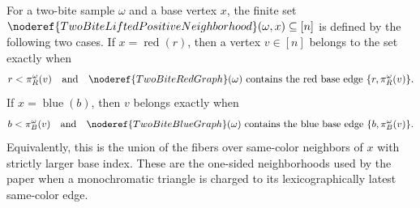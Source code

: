 \begin{definition}
For a two-bite sample \(\omega\) and a base vertex \(x\), the finite set
\(\noderef{TwoBiteLiftedPositiveNeighborhood}(\omega,x)\subseteq[n]\) is
defined by the following two cases.  If \(x=\operatorname{red}(r)\), then a
vertex \(v\in[n]\) belongs to the set exactly when
\[
r<\pi_R^\omega(v)
\quad\text{and}\quad
\noderef{TwoBiteRedGraph}(\omega)\text{ contains the red base edge }
\{r,\pi_R^\omega(v)\}.
\]
If \(x=\operatorname{blue}(b)\), then \(v\) belongs exactly when
\[
b<\pi_B^\omega(v)
\quad\text{and}\quad
\noderef{TwoBiteBlueGraph}(\omega)\text{ contains the blue base edge }
\{b,\pi_B^\omega(v)\}.
\]
Equivalently, this is the union of the fibers over same-color neighbors of
\(x\) with strictly larger base index.  These are the one-sided neighborhoods
used by the paper when a monochromatic triangle is charged to its
lexicographically latest same-color edge.
\end{definition}
